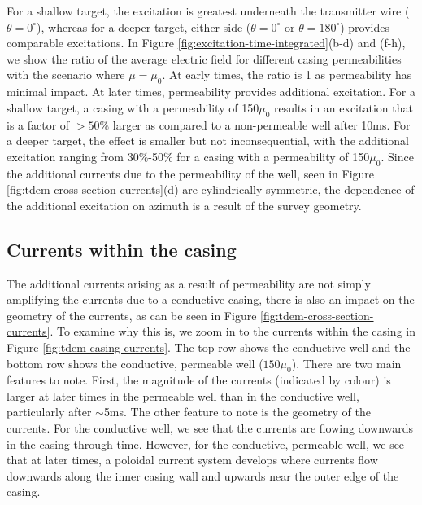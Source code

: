 \documentclass[onecolumn, extra, mreferee]{gji}
\begin{document}
For a shallow target, the excitation is greatest underneath the transmitter wire ($\theta=0^\circ$), whereas for a deeper target, either side ($\theta=0^\circ$ or $\theta=180^\circ$) provides comparable excitations. In Figure \ref{fig:excitation-time-integrated}(b-d) and (f-h), we show the ratio of the average electric field for different casing permeabilities with the scenario where $\mu=\mu_0$. At early times, the ratio is 1 as permeability has minimal impact. At later times, permeability provides additional excitation. For a shallow target, a casing with a permeability of 150$\mu_0$ results in an excitation that is a factor of $>50\%$ larger as compared to a non-permeable well after 10ms. For a deeper target, the effect is smaller but not inconsequential, with the additional excitation ranging from 30\%-50\% for a casing with a permeability of 150$\mu_0$. Since the additional currents due to the permeability of the well, seen in Figure \ref{fig:tdem-cross-section-currents}(d) are cylindrically symmetric, the dependence of the additional excitation on azimuth is a result of the survey geometry.







\subsection{Currents within the casing}
The additional currents arising as a result of permeability are not simply amplifying the currents due to a conductive casing, there is also an impact on the geometry of the currents, as can be seen in Figure \ref{fig:tdem-cross-section-currents}. To examine why this is, we zoom in to the currents within the casing in Figure \ref{fig:tdem-casing-currents}. The top row shows the conductive well and the bottom row shows the conductive, permeable well ($150\mu_0$). There are two main features to note. First, the magnitude of the currents (indicated by colour) is larger at later times in the permeable well than in the conductive well, particularly after $\sim$5ms. The other feature to note is the geometry of the currents. For the conductive well, we see that the currents are flowing downwards in the casing through time. However, for the conductive, permeable well, we see that at later times, a poloidal current system develops where currents flow downwards along the inner casing wall and upwards near the outer edge of the casing.
\end{document}
